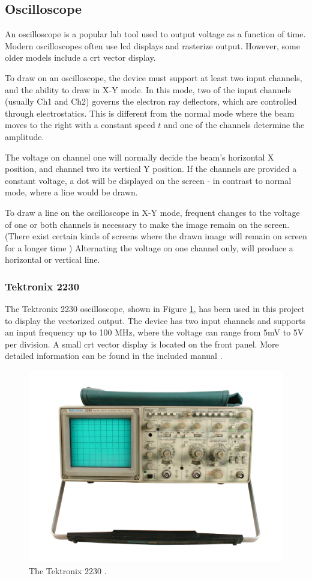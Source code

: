 \subsection{Oscilloscope}
An oscilloscope is a popular lab tool used to output voltage as a function of time.
Modern oscilloscopes often use \gls{lcd} displays and rasterize output.
However, some older models include a \gls{crt} vector display.

To draw on an oscilloscope, the device must support at least two input channels, and the ability to draw in X-Y mode.
In this mode, two of the input channels (usually Ch1 and Ch2) governs the electron ray deflectors, which are controlled through electrostatics.
This is different from the normal mode where the beam moves to the right with a constant speed \( t \) and one of the channels determine the amplitude.

The voltage on channel one will normally decide the beam's horizontal X position, and channel two its vertical Y position.
If the channels are provided a constant voltage, a dot will be displayed on the screen - in contrast to normal mode, where a line would be drawn.

To draw a line on the oscilloscope in X-Y mode, frequent changes to the voltage of one or both channels is necessary to make the image remain on the screen.
(There exist certain kinds of screens where the drawn image will remain on screen for a longer time \cite{tektronix4010})
Alternating the voltage on one channel only, will produce a horizontal or vertical line.

\subsubsection{Tektronix 2230}
The Tektronix 2230 oscilloscope, shown in Figure \ref{fig:oscilloscope}, has been used in this project to display the vectorized output.
The device has two input channels and supports an input frequency up to 100 MHz, where the voltage can range from 5mV to 5V per division.
A small \gls{crt} vector display is located on the front panel.
More detailed information can be found in the included manual \cite{tektronix2230}.

\begin{figure}[h!]
	\centering
	\includegraphics[width=0.7\linewidth]{images/oscilloscope.jpg}
    \caption{The Tektronix 2230 \cite{oscilloscope}.}
    \label{fig:oscilloscope}
\end{figure}
